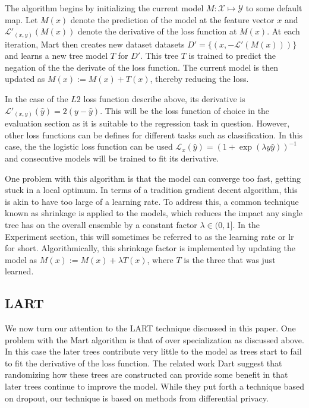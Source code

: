 \documentclass{article} %
\begin{document}
 
The algorithm begins by initializing the current model $M:\mathcal{X}\mapsto \mathcal{Y}$ to some default map. Let $M(x)$ denote the prediction of the model at the feature vector $x$ and $\mathcal{L}'_{(x,y)}(M(x))$ denote the derivative of the loss function at $M(x)$. At each iteration, Mart then creates new dataset datasets $D'=\{(x,-\mathcal{L}'(M(x)))\}$  and learns a new tree model $T$ for $D'$. This tree $T$ is trained to predict the negation of the the derivate of the loss function. The current model is then updated as $M(x):= M(x) + T(x)$, thereby reducing the loss.

In the case of the $L2$ loss function describe above, its derivative is $\mathcal{L}'_{(x,y)}(\hat{y}) = 2(y - \hat{y})$. This will be the loss function of choice in the evaluation section as it is suitable to the regression task in question. However, other loss functions can be defines for different tasks such as classification. In this case, the  the logistic loss function can be used $\mathcal{L}_x (\hat{y}) =( 1 + \exp(\lambda y \hat{y}))^{-1}$ and consecutive models will be trained to fit its derivative.

One problem with this algorithm is that the model can converge too fast, getting stuck in a local optimum. In terms of a tradition gradient decent algorithm, this is akin to have too large of a learning rate. To address this, a common technique known as shrinkage is applied to the models, which reduces the impact any single tree has on the overall ensemble by a constant factor $\lambda\in (0,1]$. In the Experiment section, this will sometimes be referred to as the learning rate or lr for short. Algorithmically,  this shrinkage factor is implemented by updating the model as $M(x):= M(x) + \lambda T(x)$, where $T$ is the three that was just learned.


\subsection{LART}
We now turn our attention to the LART technique discussed in this paper. One problem with the Mart algorithm is that of over specialization as discussed above\cite{dart}. In this case the later trees contribute very little to the  model as trees start to fail to fit the derivative of the loss function. The related work Dart \cite{dart} suggest that randomizing how these trees are constructed can provide some benefit in that later trees continue to improve the model. While they put forth a technique based on dropout, our technique is based on methods from differential privacy.
\end{document}
